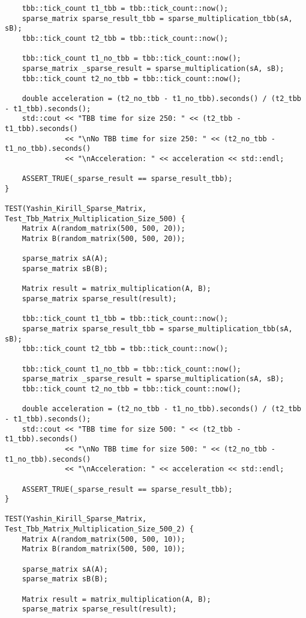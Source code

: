 \documentclass{report}
\begin{document}
\begin{lstlisting}
    tbb::tick_count t1_tbb = tbb::tick_count::now();
    sparse_matrix sparse_result_tbb = sparse_multiplication_tbb(sA, sB);
    tbb::tick_count t2_tbb = tbb::tick_count::now();

    tbb::tick_count t1_no_tbb = tbb::tick_count::now();
    sparse_matrix _sparse_result = sparse_multiplication(sA, sB);
    tbb::tick_count t2_no_tbb = tbb::tick_count::now();

    double acceleration = (t2_no_tbb - t1_no_tbb).seconds() / (t2_tbb - t1_tbb).seconds();
    std::cout << "TBB time for size 250: " << (t2_tbb - t1_tbb).seconds()
              << "\nNo TBB time for size 250: " << (t2_no_tbb - t1_no_tbb).seconds()
              << "\nAcceleration: " << acceleration << std::endl;

    ASSERT_TRUE(_sparse_result == sparse_result_tbb);
}

TEST(Yashin_Kirill_Sparse_Matrix, Test_Tbb_Matrix_Multiplication_Size_500) {
    Matrix A(random_matrix(500, 500, 20));
    Matrix B(random_matrix(500, 500, 20));

    sparse_matrix sA(A);
    sparse_matrix sB(B);

    Matrix result = matrix_multiplication(A, B);
    sparse_matrix sparse_result(result);

    tbb::tick_count t1_tbb = tbb::tick_count::now();
    sparse_matrix sparse_result_tbb = sparse_multiplication_tbb(sA, sB);
    tbb::tick_count t2_tbb = tbb::tick_count::now();

    tbb::tick_count t1_no_tbb = tbb::tick_count::now();
    sparse_matrix _sparse_result = sparse_multiplication(sA, sB);
    tbb::tick_count t2_no_tbb = tbb::tick_count::now();

    double acceleration = (t2_no_tbb - t1_no_tbb).seconds() / (t2_tbb - t1_tbb).seconds();
    std::cout << "TBB time for size 500: " << (t2_tbb - t1_tbb).seconds()
              << "\nNo TBB time for size 500: " << (t2_no_tbb - t1_no_tbb).seconds()
              << "\nAcceleration: " << acceleration << std::endl;

    ASSERT_TRUE(_sparse_result == sparse_result_tbb);
}

TEST(Yashin_Kirill_Sparse_Matrix, Test_Tbb_Matrix_Multiplication_Size_500_2) {
    Matrix A(random_matrix(500, 500, 10));
    Matrix B(random_matrix(500, 500, 10));

    sparse_matrix sA(A);
    sparse_matrix sB(B);

    Matrix result = matrix_multiplication(A, B);
    sparse_matrix sparse_result(result);


\end{lstlisting}
\end{document}
